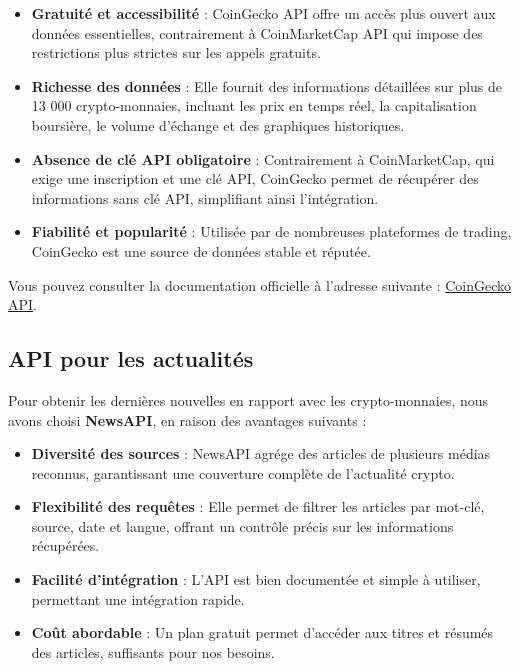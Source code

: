 \documentclass[a4paper,11pt]{article}
\begin{document}
\begin{itemize}
    \item \textbf{Gratuit\'e et accessibilit\'e} : CoinGecko API offre un acc\`es plus ouvert aux donn\'ees essentielles, contrairement \`a CoinMarketCap API qui impose des restrictions plus strictes sur les appels gratuits.\
    \item \textbf{Richesse des donn\'ees} : Elle fournit des informations d\'etaill\'ees sur plus de 13 000 crypto-monnaies, incluant les prix en temps r\'eel, la capitalisation boursi\`ere, le volume d'\'echange et des graphiques historiques.\
    \item \textbf{Absence de cl\'e API obligatoire} : Contrairement \`a CoinMarketCap, qui exige une inscription et une cl\'e API, CoinGecko permet de r\'ecup\'erer des informations sans cl\'e API, simplifiant ainsi l’int\'egration.\
    \item \textbf{Fiabilit\'e et popularit\'e} : Utilis\'ee par de nombreuses plateformes de trading, CoinGecko est une source de donn\'ees stable et r\'eput\'ee.
\end{itemize}

Vous pouvez consulter la documentation officielle \`a l'adresse suivante : \href{https://www.coingecko.com/en/api}{CoinGecko API}.

\subsection{API pour les actualit\'es}
Pour obtenir les derni\`eres nouvelles en rapport avec les crypto-monnaies, nous avons choisi \textbf{NewsAPI}, en raison des avantages suivants :

\begin{itemize}
    \item \textbf{Diversit\'e des sources} : NewsAPI agr\'ege des articles de plusieurs m\'edias reconnus, garantissant une couverture compl\`ete de l’actualit\'e crypto.\
    \item \textbf{Flexibilit\'e des requ\^etes} : Elle permet de filtrer les articles par mot-cl\'e, source, date et langue, offrant un contr\^ole pr\'ecis sur les informations r\'ecup\'er\'ees.\
    \item \textbf{Facilit\'e d’int\'egration} : L’API est bien document\'ee et simple \`a utiliser, permettant une int\'egration rapide.\
    \item \textbf{Co\^ut abordable} : Un plan gratuit permet d’acc\'eder aux titres et r\'esum\'es des articles, suffisants pour nos besoins.
\end{itemize}
\end{document}
